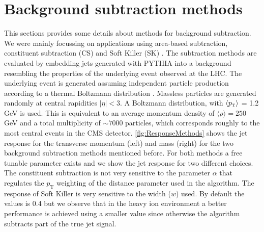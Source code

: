 \section{Background subtraction methods}
\label{app:background}

This sections provides some details about methods for background subtraction. We were mainly focussing on applications using area-based subtraction, constituent subtraction (CS) \cite{Berta:2014eza} and Soft Killer (SK) \cite{Cacciari:2014gra}. The subtraction methods are evaluated by embedding jets generated with PYTHIA into a background resembling the properties of the underlying event observed at the LHC. The underlying event is generated assuming independent particle production according to a thermal Boltzmann distribution \cite{deBarros:2012ws}. Massless particles are generated randomly at central rapidities $|\eta|<3$. A Boltzmann distribution, with $\langle p_{\text{\tiny T}} \rangle$ = 1.2 GeV is used. This is equivalent to an average momentum density of $\langle \rho \rangle =250$ GeV and a total multiplicity of $\sim 7000$ particles, which corresponds roughly to the most central events in the CMS detector. \autoref{fig:ResponseMethods} shows the jet response for the transverse momentum (left) and mass (right) for the two background subtraction methods mentioned before. For both methods a free tunable parameter exists and we show the jet response for two different choices. The constituent subtraction is not very sensitive to the parameter $\alpha$ that regulates the $p_{\mathrm{T}}$ weighting of the distance parameter used in the algorithm. The response of Soft Killer is very sensitive to the width ($w$) used. By default the values is 0.4 but we observe that in the heavy ion environment a better performance is achieved using a smaller value since otherwise the algorithm subtracts part of the true jet signal.


